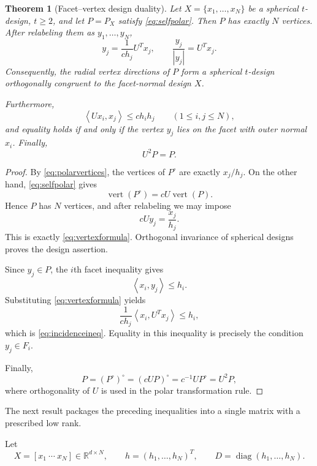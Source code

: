 \documentclass[11pt]{amsart}
\newtheorem{theorem}{Theorem}[section]
\theoremstyle{definition}
\theoremstyle{remark}
\newcommand{\R}{\mathbb R}
\newcommand{\Verts}{\operatorname{vert}}
\newcommand{\diag}{\operatorname{diag}}
\newcommand{\ip}[2]{\left\langle #1,#2\right\rangle}
\begin{document}
\begin{theorem}[Facet--vertex design duality]\label{thm:bidual}
Let $X=\{x_1,\ldots,x_N\}$ be a spherical $t$-design, $t\ge2$, and let $P=P_X$ satisfy \eqref{eq:selfpolar}.  Then $P$ has exactly $N$ vertices.  After relabeling them as $y_1,\ldots,y_N$,
\begin{equation}\label{eq:vertexformula}
 \boxed{y_j=\frac{1}{c h_j}U^Tx_j,}
 \qquad
 \boxed{\frac{y_j}{|y_j|}=U^Tx_j.}
\end{equation}
Consequently, the radial vertex directions of $P$ form a spherical $t$-design orthogonally congruent to the facet-normal design $X$.

Furthermore,
\begin{equation}\label{eq:incidenceineq}
 \ip{Ux_i}{x_j}\le c h_i h_j
 \qquad(1\le i,j\le N),
\end{equation}
and equality holds if and only if the vertex $y_j$ lies on the facet with outer normal $x_i$.
Finally,
\begin{equation}\label{eq:U2sym}
 U^2P=P.
\end{equation}
\end{theorem}

\begin{proof}
By \eqref{eq:polarvertices}, the vertices of $P^\circ$ are exactly $x_j/h_j$.  On the other hand, \eqref{eq:selfpolar} gives
\[
 \Verts(P^\circ)=cU\Verts(P).
\]
Hence $P$ has $N$ vertices, and after relabeling we may impose
\[
 cUy_j=\frac{x_j}{h_j}.
\]
This is exactly \eqref{eq:vertexformula}.  Orthogonal invariance of spherical designs proves the design assertion.

Since $y_j\in P$, the $i$th facet inequality gives
\[
 \ip{x_i}{y_j}\le h_i.
\]
Substituting \eqref{eq:vertexformula} yields
\[
 \frac1{c h_j}\ip{x_i}{U^Tx_j}\le h_i,
\]
which is \eqref{eq:incidenceineq}.  Equality in this inequality is precisely the condition $y_j\in F_i$.

Finally,
\[
 P=(P^\circ)^\circ=(cUP)^\circ=c^{-1}UP^\circ=U^2P,
\]
where orthogonality of $U$ is used in the polar transformation rule.  \qedhere
\end{proof}

The next result packages the preceding inequalities into a single matrix with a prescribed low rank.

Let
\[
 X=[x_1\ \cdots\ x_N]\in\R^{d\times N},
 \qquad
 h=(h_1,\ldots,h_N)^T,
 \qquad
 D=\diag(h_1,\ldots,h_N).
\]
\end{document}
